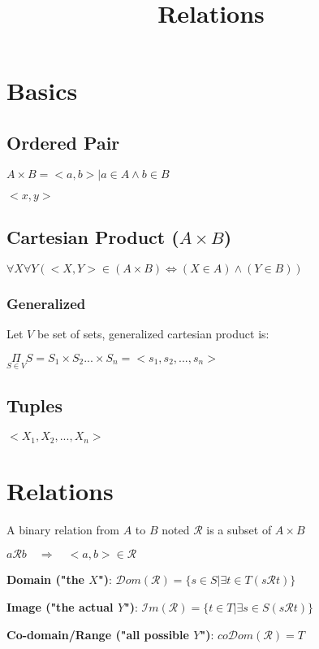 \documentclass[12pt]{article}
\title{\textbf{Relations}}
\date{}
\begin{document}
\maketitle

\begin{spacing}{1.5}

\section{Basics}

\subsection{Ordered Pair}

$A \times B = {<a, b> | a \in A \wedge b \in B}$

$< x, y >$

\subsection{Cartesian Product ($A \times B$)}

$\forall X \forall Y ( <X, Y> \in (A \times B) \Leftrightarrow (X \in A) \wedge (Y \in B) )$

\subsubsection{Generalized}

Let $V$ be set of sets, generalized cartesian product is:

$\underset{S \in V}{\Pi} S = S_1 \times S_2 ... \times S_n = <s_1, s_2, ..., s_n>$

\subsection{Tuples}

$< X_1, X_2, ..., X_n >$


\section{Relations}

A binary relation from $A$ to $B$ noted $\mathcal{R}$ is a subset of $A \times B$

\begin{itemize*}
	\item $a \mathcal{R} b \quad \Rightarrow \quad <a, b> \in \mathcal{R}$ 
	\item \textbf{Domain ("the $X$")}: $\mathcal{D}om(\mathcal{R}) = \{s \in S | \exists t \in T (s \mathcal{R} t)\}$
	\item \textbf{Image ("the actual $Y$")}: $\mathcal{I}m(\mathcal{R}) = \{ t \in T | \exists s \in S (s \mathcal{R} t) \}$
	\item \textbf{Co-domain/Range ("all possible $Y$")}: $co\mathcal{D}om(\mathcal{R}) = T$
	

\end{itemize*}
\end{spacing}
\end{document}
